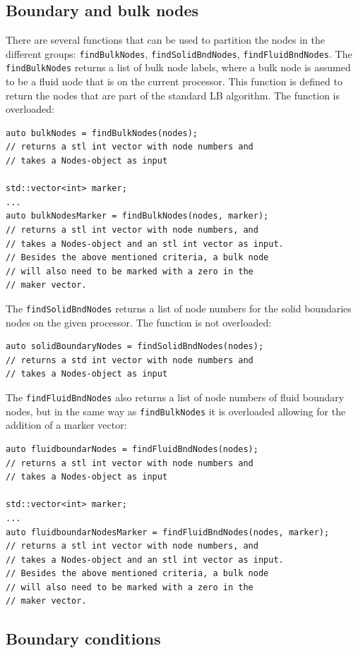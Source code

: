 \documentclass[11pt,a4paper]{report}
\begin{document}
\subsection{Boundary and bulk nodes}
\label{sec:boundary and bulk nodes}
There are several functions that can be used to partition the nodes in the different groups: \texttt{findBulkNodes}, \texttt{findSolidBndNodes}, \texttt{findFluidBndNodes}.
The \texttt{findBulkNodes} returns a list of bulk node labels, where a bulk node is assumed to be a fluid node that is on the current processor. This function is defined to return the nodes that are part of the standard LB algorithm. The function is overloaded:
\begin{verbatim}
auto bulkNodes = findBulkNodes(nodes);
// returns a stl int vector with node numbers and 
// takes a Nodes-object as input

std::vector<int> marker;
...
auto bulkNodesMarker = findBulkNodes(nodes, marker);
// returns a stl int vector with node numbers, and 
// takes a Nodes-object and an stl int vector as input.
// Besides the above mentioned criteria, a bulk node
// will also need to be marked with a zero in the 
// maker vector. 
\end{verbatim}
The \texttt{findSolidBndNodes} returns a list of node numbers for the solid boundaries nodes on the given processor. The function is not overloaded:  
\begin{verbatim}
auto solidBoundaryNodes = findSolidBndNodes(nodes);
// returns a std int vector with node numbers and 
// takes a Nodes-object as input
\end{verbatim}
The \texttt{findFluidBndNodes} also returns a list of node numbers of fluid boundary nodes, but in the same way as \texttt{findBulkNodes} it is overloaded allowing for the addition of a marker vector:
\begin{verbatim}
auto fluidboundarNodes = findFluidBndNodes(nodes);
// returns a stl int vector with node numbers and 
// takes a Nodes-object as input

std::vector<int> marker;
...
auto fluidboundarNodesMarker = findFluidBndNodes(nodes, marker);
// returns a stl int vector with node numbers, and 
// takes a Nodes-object and an stl int vector as input.
// Besides the above mentioned criteria, a bulk node
// will also need to be marked with a zero in the 
// maker vector. 
\end{verbatim}

\subsection{Boundary conditions}
\end{document}
